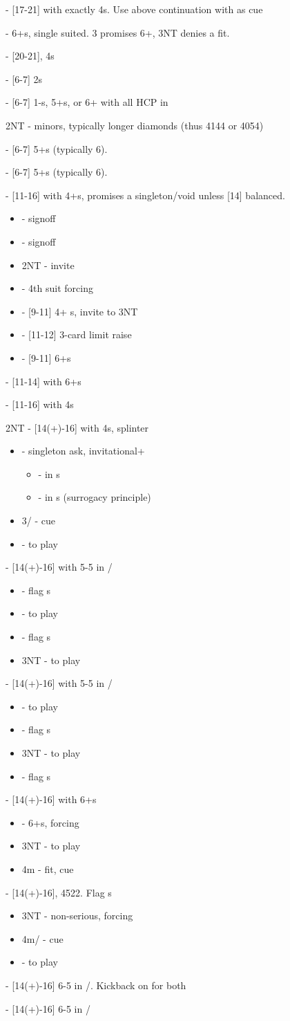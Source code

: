 \documentclass[12pt]{report}
\newcommand{\ul}[1]{\begin{itemize}#1\end{itemize}}
\newcommand{\li}{\item[~]}
\begin{document}
{{{{                    \li {} - [17-21] with exactly 4\di{}s.  Use above continuation with  as cue
                    \li {} - 6+\he{}s, single suited.  3\sp{} promises 6+, 3NT denies a fit.
                    \li {} - [20-21], 4\sp{}s
                }
                \li {} - [6-7] 2\he{}s
                \li {} - [6-7] 1-\he{}s, 5+\sp{}s, or 6+ with all HCP in \sp{}
                \li 2NT - minors, typically longer diamonds (thus 4144 or 4054)
                \li {} - [6-7] 5+\cl{}s (typically 6).
                \li {} - [6-7] 5+\di{}s (typically 6).
            }
            \li {} - [11-16] with 4+\di{}s, promises a singleton/void unless [14] balanced.
            \ul {
                \li {} - signoff
                \li \sp2 - signoff
                \li 2NT - invite
                \li \cl3 - 4th suit forcing
                \li \di3 - [9-11] 4+ \di{}s, invite to 3NT
                \li \he3 - [11-12] 3-card limit raise
                \li \sp3 - [9-11] 6+\sp{}s
            }
            \li {} - [11-14] with 6+\he{}s
            \li {} - [11-16] with 4\sp{}s
            \li 2NT - [14(+)-16] with 4\sp{}s, splinter
            \ul {
                \li {} - singleton ask, invitational+
                \ul {
                    \li \di3 - in \di{}s
                    \li \he3 - in \cl{}s (surrogacy principle)
                }
                \li 3\di{}/\he{} - cue
                \li \sp3 - to play
            }
            \li {} - [14(+)-16] with 5-5 in \cl{}/\he{}
            \ul {
                \li {} - flag \cl{}s
                \li \he3 - to play
                \li \sp3 - flag \he{}s
                \li 3NT - to play
            }
            \li {} - [14(+)-16] with 5-5 in \di{}/\he{}
            \ul {
                \li {} - to play
                \li \sp3 - flag \di{}s
                \li 3NT - to play
                \li \cl4 - flag \he{}s
            }
            \li {} - [14(+)-16] with 6+\he{}s
            \ul {
                \li {} - 6+\sp{}s, forcing
                \li 3NT - to play
                \li 4m - fit, cue
            }
            \li {} - [14(+)-16], 4522.  Flag \sp{}s
            \ul {
                \li 3NT - non-serious, forcing
                \li 4m/\he{} - cue
                \li \sp4 - to play
            }
            \li {} - [14(+)-16] 6-5 in \cl{}/\he{}.  Kickback on for both
            \li {} - [14(+)-16] 6-5 in \di{}/\he{}
        }

}
\end{document}

